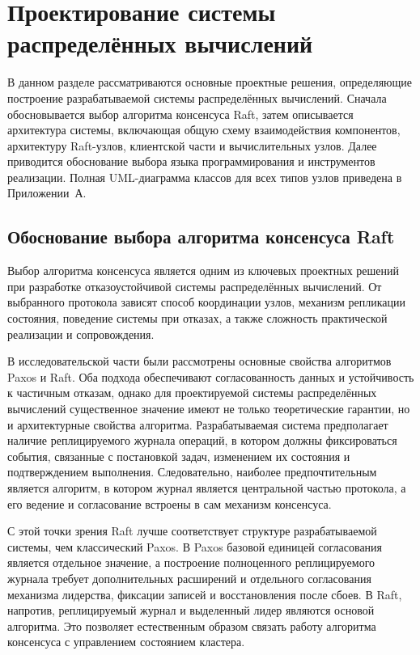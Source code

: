 \section{Проектирование системы распределённых вычислений}

В данном разделе рассматриваются основные проектные решения,
определяющие построение разрабатываемой системы распределённых
вычислений. Сначала обосновывается выбор алгоритма консенсуса Raft,
затем описывается архитектура системы, включающая общую схему
взаимодействия компонентов, архитектуру Raft-узлов, клиентской части и
вычислительных узлов. Далее приводится обоснование выбора языка
программирования и инструментов реализации. Полная UML-диаграмма
классов для всех типов узлов приведена в Приложении~А.

\subsection{Обоснование выбора алгоритма консенсуса Raft}

Выбор алгоритма консенсуса является одним из ключевых проектных решений при
разработке отказоустойчивой системы распределённых вычислений. От выбранного
протокола зависят способ координации узлов, механизм репликации состояния,
поведение системы при отказах, а также сложность практической реализации и
сопровождения.

В исследовательской части были рассмотрены основные свойства алгоритмов Paxos и
Raft. Оба подхода обеспечивают согласованность данных и устойчивость к
частичным отказам, однако для проектируемой системы распределённых вычислений
существенное значение имеют не только теоретические гарантии, но и
архитектурные свойства алгоритма. Разрабатываемая система предполагает наличие
реплицируемого журнала операций, в котором должны фиксироваться события,
связанные с постановкой задач, изменением их состояния и подтверждением
выполнения. Следовательно, наиболее предпочтительным является алгоритм, в
котором журнал является центральной частью протокола, а его ведение и
согласование встроены в сам механизм консенсуса.

С этой точки зрения Raft лучше соответствует структуре разрабатываемой системы,
чем классический Paxos. В Paxos базовой единицей согласования является
отдельное значение, а построение полноценного реплицируемого журнала требует
дополнительных расширений и отдельного согласования механизма лидерства,
фиксации записей и восстановления после сбоев. В Raft, напротив, реплицируемый
журнал и выделенный лидер являются основой алгоритма. Это позволяет
естественным образом связать работу алгоритма консенсуса с управлением
состоянием кластера.

